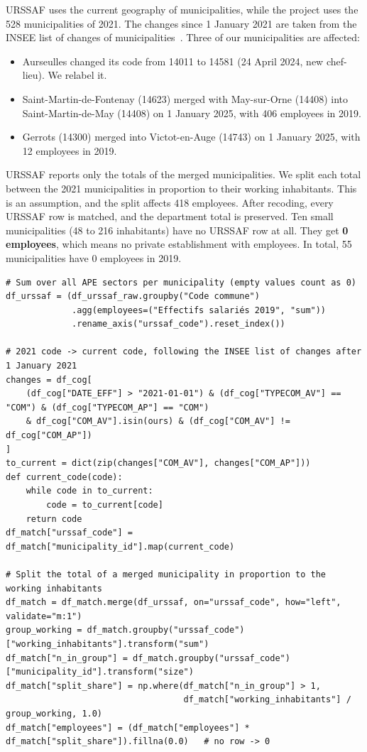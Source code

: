 URSSAF uses the current geography of municipalities, while the project uses the 528 municipalities of 2021. The changes
since 1 January 2021 are taken from the INSEE list of changes of municipalities~\cite{insee-cog-2026}. Three of our
municipalities are affected:
\begin{itemize}
  \item Aurseulles changed its code from 14011 to 14581 (24 April 2024, new chef-lieu). We relabel it.
  \item Saint-Martin-de-Fontenay (14623) merged with May-sur-Orne (14408) into Saint-Martin-de-May (14408) on 1 January
  2025, with 406 employees in 2019.
  \item Gerrots (14300) merged into Victot-en-Auge (14743) on 1 January 2025, with 12 employees in 2019.
\end{itemize}
URSSAF reports only the totals of the merged municipalities. We split each total between the 2021 municipalities in
proportion to their working inhabitants. This is an assumption, and the split affects 418 employees. After recoding,
every URSSAF row is matched, and the department total is preserved. Ten small municipalities (48 to 216 inhabitants)
have no URSSAF row at all. They get \textbf{0 employees}, which means no private establishment with employees. In
total, 55 municipalities have 0 employees in 2019.
\begin{lstlisting}[style=py]
# Sum over all APE sectors per municipality (empty values count as 0)
df_urssaf = (df_urssaf_raw.groupby("Code commune")
             .agg(employees=("Effectifs salariés 2019", "sum"))
             .rename_axis("urssaf_code").reset_index())

# 2021 code -> current code, following the INSEE list of changes after 1 January 2021
changes = df_cog[
    (df_cog["DATE_EFF"] > "2021-01-01") & (df_cog["TYPECOM_AV"] == "COM") & (df_cog["TYPECOM_AP"] == "COM")
    & df_cog["COM_AV"].isin(ours) & (df_cog["COM_AV"] != df_cog["COM_AP"])
]
to_current = dict(zip(changes["COM_AV"], changes["COM_AP"]))
def current_code(code):
    while code in to_current:
        code = to_current[code]
    return code
df_match["urssaf_code"] = df_match["municipality_id"].map(current_code)

# Split the total of a merged municipality in proportion to the working inhabitants
df_match = df_match.merge(df_urssaf, on="urssaf_code", how="left", validate="m:1")
group_working = df_match.groupby("urssaf_code")["working_inhabitants"].transform("sum")
df_match["n_in_group"] = df_match.groupby("urssaf_code")["municipality_id"].transform("size")
df_match["split_share"] = np.where(df_match["n_in_group"] > 1,
                                   df_match["working_inhabitants"] / group_working, 1.0)
df_match["employees"] = (df_match["employees"] * df_match["split_share"]).fillna(0.0)   # no row -> 0
\end{lstlisting}

